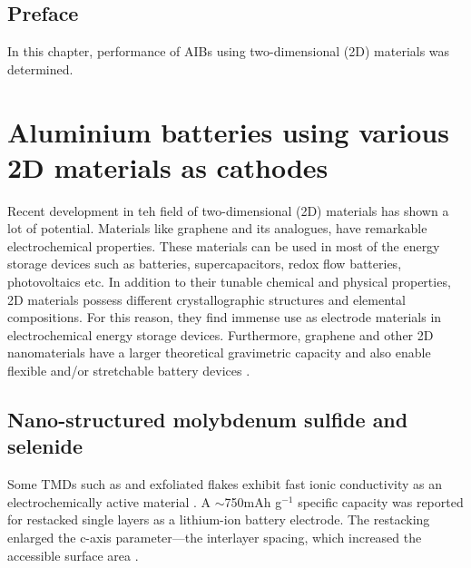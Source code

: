 \section*{Preface}
In this chapter, performance of AIBs using two-dimensional (2D) materials was determined.
\pagebreak
\chapter{Aluminium batteries using various 2D materials as cathodes} 
\label{chap6} 
Recent development in teh field of two-dimensional (2D) materials has shown a lot of potential. Materials like graphene and its analogues, have remarkable electrochemical properties. These materials can be used in most of the energy storage devices such as batteries, supercapacitors, redox flow batteries, photovoltaics etc. In addition to their tunable chemical and physical properties, 2D materials possess different crystallographic structures and elemental compositions. For this reason, they find immense use as electrode materials in electrochemical energy storage devices\cite{wang_graphene_2009,bonaccorso_graphene_2015}. Furthermore, graphene and other 2D nanomaterials have a larger theoretical gravimetric capacity and also enable flexible and/or stretchable battery devices \cite{zhou_progress_2014}. 

\section{Nano-structured molybdenum sulfide and selenide}
Some TMDs such as  and exfoliated  flakes exhibit fast ionic conductivity as an electrochemically active material \cite{du,whitt}. A $\sim$750mAh g$^{-1}$ specific capacity was reported for restacked  single layers as a lithium-ion battery electrode. The restacking enlarged the c-axis parameter—the interlayer spacing, which increased the accessible surface area \cite{ammun}.
